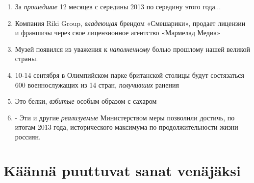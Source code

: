 \documentclass[paper=a4, fontsize=11pt]{scrartcl}
\begin{document}
\begin{enumerate}
    \item За \emph{прошедшие} 12 месяцев с середины 2013 по середину этого года... \\
    \underline{\hspace{12cm}}
    \item Компания Riki Group, \emph{владеющая} брендом «Смешарики», продает лицензии и франшизы через свое лицензионное агентство «Мармелад Медиа» \\
    \underline{\hspace{12cm}}
    \item Музей появился из уважения к \emph{наполненному} болью прошлому нашей великой страны. \\
    \underline{\hspace{12cm}}
    \item 10-14 сентября в Олимпийском парке британской столицы будут состязаться 600 военнослужащих из 14 стран, \emph{получивших} ранения\\
    \underline{\hspace{12cm}}
    \item Это белки, \emph{взбитые} особым образом с сахаром \\
    \underline{\hspace{12cm}}
    \item - Эти и другие \emph{реализуемые} Министерством меры позволили достичь, по итогам 2013 года, исторического максимума по продолжительности жизни россиян. \\
    \underline{\hspace{12cm}}
\end{enumerate}


\section{Käännä puuttuvat sanat venäjäksi}
\end{document}
